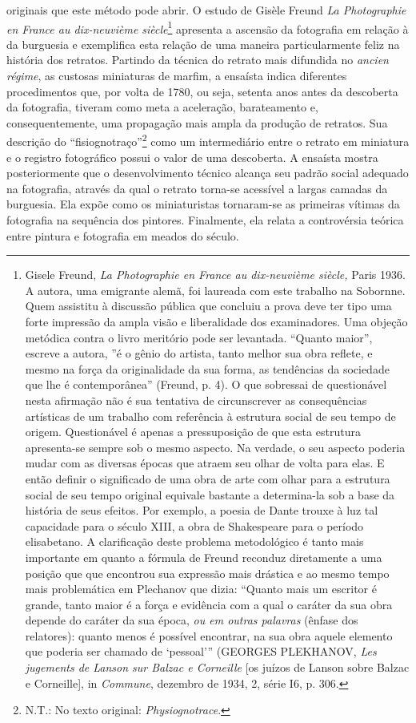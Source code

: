 originais que este método pode abrir. O estudo de Gisèle Freund \emph{La
Photographie en France au dix-neuvième siècle}\footnote{Gisele Freund,
  \emph{La Photographie en France au dix-neuvième siècle,} Paris 1936. A
  autora, uma emigrante alemã, foi laureada com este trabalho na
  Sobornne. Quem assistitu à discussão pública que concluiu a prova deve
  ter tipo uma forte impressão da ampla visão e liberalidade dos
  examinadores. Uma objeção metódica contra o livro meritório pode ser
  levantada. ``Quanto maior'', escreve a autora, ''é o gênio do artista,
  tanto melhor sua obra reflete, e mesmo na força da originalidade da
  sua forma, as tendências da sociedade que lhe é contemporânea''
  (Freund, p. 4). O que sobressai de questionável nesta afirmação não é
  sua tentativa de circunscrever as consequências artísticas de um
  trabalho com referência à estrutura social de seu tempo de origem.
  Questionável é apenas a pressuposição de que esta estrutura
  apresenta-se sempre sob o mesmo aspecto. Na verdade, o seu aspecto
  poderia mudar com as diversas épocas que atraem seu olhar de volta
  para elas. E então definir o significado de uma obra de arte com olhar
  para a estrutura social de seu tempo original equivale bastante a
  determina-la sob a base da história de seus efeitos. Por exemplo, a
  poesia de Dante trouxe à luz tal capacidade para o século XIII, a obra
  de Shakespeare para o período elisabetano. A clarificação deste
  problema metodológico é tanto mais importante em quanto a fórmula de
  Freund reconduz diretamente a uma posição que que encontrou sua
  expressão mais drástica e ao mesmo tempo mais problemática em
  Plechanov que dizia: ``Quanto mais um escritor é grande, tanto maior é
  a força e evidência com a qual o caráter da sua obra depende do
  caráter da sua época, \emph{ou em outras palavras} (ênfase dos
  relatores): quanto menos é possível encontrar, na sua obra aquele
  elemento que poderia ser chamado de `pessoal''' (GEORGES PLEKHANOV,
  \emph{Les jugements de Lanson sur Balzac e Corneille} {[}os juízos de
  Lanson sobre Balzac e Corneille{]}, in \emph{Commune}, dezembro de
  1934, 2, série I6, p. 306.} apresenta a ascensão da fotografia em
relação à da burguesia e exemplifica esta relação de uma maneira
particularmente feliz na história dos retratos. Partindo da técnica do
retrato mais difundida no \emph{ancien régime}, as custosas miniaturas
de marfim, a ensaísta indica diferentes procedimentos que, por volta de
1780, ou seja, setenta anos antes da descoberta da fotografia, tiveram
como meta a aceleração, barateamento e, consequentemente, uma propagação
mais ampla da produção de retratos. Sua descrição do
``fisiognotraço''\footnote{N.T.: No texto original:
  \emph{Physiognotrace}.} como um intermediário entre o retrato em
miniatura e o registro fotográfico possui o valor de uma descoberta. A
ensaísta mostra posteriormente que o desenvolvimento técnico alcança seu
padrão social adequado na fotografia, através da qual o retrato torna-se
acessível a largas camadas da burguesia. Ela expõe como os miniaturistas
tornaram-se as primeiras vítimas da fotografia na sequência dos
pintores. Finalmente, ela relata a controvérsia teórica entre pintura e
fotografia em meados do século.

